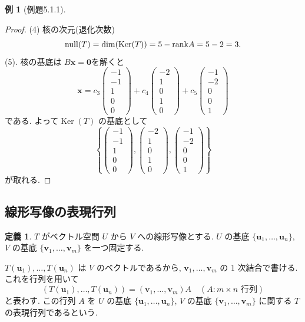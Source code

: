 \documentclass[dvipdfmx,a4paper,11pt]{article} %
\theoremstyle{definition}
\newtheorem{defn}[thm]{定義}
\newtheorem{eg}[thm]{例}
\begin{document}
\begin{eg}[例題5.1.1]
\begin{proof}
(4) 核の次元(退化次数)
$$\operatorname{null}(T)=\dim(\operatorname{Ker}(T)) = 
5-{\rm rank}A = 5-2=3.
$$
(5). 核の基底は
$B\bm{x}=\bm{0}$を解くと
$$
\bm{x}=
c_3
\begin{pmatrix}
-1\\
-1\\
1\\
0\\
0
\end{pmatrix}+
c_4
\begin{pmatrix}
-2\\
1\\
0\\
1\\
0
\end{pmatrix}
+
c_5
\begin{pmatrix}
-1\\
-2\\
0\\
0\\
1
\end{pmatrix}
$$
である. 
よって\(\operatorname{Ker}(T)\) の基底として
\[
\left\{
\begin{pmatrix}
-1\\
-1\\
1\\
0\\
0
\end{pmatrix},
\begin{pmatrix}
-2\\
1\\
0\\
1\\
0
\end{pmatrix},
\begin{pmatrix}
-1\\
-2\\
0\\
0\\
1
\end{pmatrix}
\right\}
\]
が取れる.

\end{proof}
\end{eg}

\subsection{線形写像の表現行列 \cite[5.2節]{M}}

\begin{defn}
\(T\) がベクトル空間 \(U\) から \(V\) への線形写像とする. \(U\) の基底
\(
\{\bm{u}_1,\ldots,\bm{u}_n\},
\)
\(V\) の基底
\(
\{\bm{v}_1,\ldots,\bm{v}_m\}
\)
を一つ固定する. 

\(T(\bm{u}_1),\ldots,T(\bm{u}_n)\) は \(V\) のベクトルであるから, \(\bm{v}_1,\ldots,\bm{v}_m\) の \(1\) 次結合で書ける.
これを行列を用いて
\[
(T(\bm{u}_1),\ldots,T(\bm{u}_n))
=
(\bm{v}_1,\ldots,\bm{v}_m)A
\quad
(A\colon m\times n\text{ 行列})
\]
と表わす. この行列 \(A\) を \(U\) の基底 \(\{\bm{u}_1,\ldots,\bm{u}_n\}\), \(V\) の基底 \(\{\bm{v}_1,\ldots,\bm{v}_m\}\) に関する \(T\) の表現行列であるという.
\end{defn}
\end{document}
